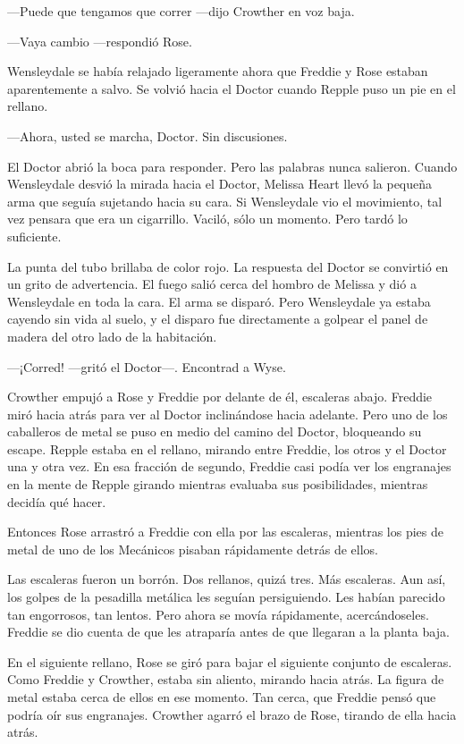 {---Puede que tengamos que correr ---dijo Crowther en voz baja.}

{---Vaya cambio ---respondió Rose.}

{Wensleydale se había relajado ligeramente ahora que Freddie y Rose
	estaban aparentemente a salvo. Se volvió hacia el Doctor cuando Repple
puso un pie en el rellano.}

{---Ahora, usted se marcha, Doctor. Sin discusiones.}

{El Doctor abrió la boca para responder. Pero las palabras nunca
	salieron. Cuando Wensleydale desvió la mirada hacia el Doctor, Melissa
	Heart llevó la pequeña arma que seguía sujetando hacia su cara. Si
	Wensleydale vio el movimiento, tal vez pensara que era un cigarrillo.
Vaciló, sólo un momento. Pero tardó lo suficiente.}

{La punta del tubo brillaba de color rojo. La respuesta del Doctor se
	convirtió en un grito de advertencia. El fuego salió cerca del hombro de
	Melissa y dió a Wensleydale en toda la cara. El arma se disparó. Pero
	Wensleydale ya estaba cayendo sin vida al suelo, y el disparo fue
	directamente a golpear el panel de madera del otro lado de la
habitación.}

{---¡Corred! ---gritó el Doctor---. Encontrad a Wyse.}

{Crowther empujó a Rose y Freddie por delante de él, escaleras abajo.
	Freddie miró hacia atrás para ver al Doctor inclinándose hacia adelante.
	Pero uno de los caballeros de metal se puso en medio del camino del
	Doctor, bloqueando su escape. Repple estaba en el rellano, mirando entre
	Freddie, los otros y el Doctor una y otra vez. En esa fracción de
	segundo, Freddie casi podía ver los engranajes en la mente de Repple
	girando mientras evaluaba sus posibilidades, mientras decidía qué
hacer.}

{Entonces Rose arrastró a Freddie con ella por las escaleras, mientras
	los pies de metal de uno de los Mecánicos pisaban rápidamente detrás de
ellos.}

{Las escaleras fueron un borrón. Dos rellanos, quizá tres. Más
	escaleras. Aun así, los golpes de la pesadilla metálica les seguían
	persiguiendo. Les habían parecido tan engorrosos, tan lentos. Pero ahora
	se movía rápidamente, acercándoseles. Freddie se dio cuenta de que les
atraparía antes de que llegaran a la planta baja.}

{En el siguiente rellano, Rose se giró para bajar el siguiente conjunto
	de escaleras. Como Freddie y Crowther, estaba sin aliento, mirando hacia
	atrás. La figura de metal estaba cerca de ellos en ese momento. Tan
	cerca, que Freddie pensó que podría oír sus engranajes. Crowther agarró
el brazo de Rose, tirando de ella hacia atrás.}

